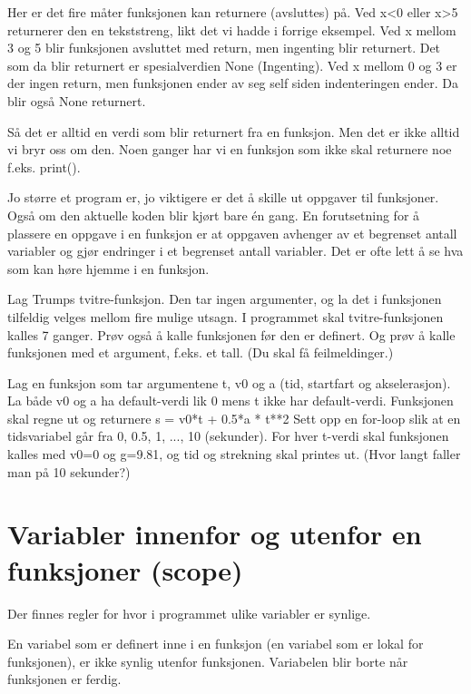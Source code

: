 Her er det fire måter funksjonen kan returnere (avsluttes) på. Ved x<0 eller x>5 returnerer den en tekststreng, likt det vi hadde i forrige eksempel. Ved x mellom 3 og 5 blir funksjonen avsluttet med return, men ingenting blir returnert. Det som da blir returnert er spesialverdien None (Ingenting). Ved x mellom 0 og 3 er der ingen return, men funksjonen ender av seg self siden indenteringen ender. Da blir også None returnert.

Så det er alltid en verdi som blir returnert fra en funksjon. Men det er ikke alltid vi bryr oss om den. Noen ganger har vi en funksjon som ikke skal returnere noe f.eks. print().

Jo større et program er, jo viktigere er det å skille ut oppgaver til funksjoner. Også om den aktuelle koden blir kjørt bare én gang. En forutsetning for å plassere en oppgave i en funksjon er at oppgaven avhenger av et begrenset antall variabler og gjør endringer i et begrenset antall variabler. Det er ofte lett å se hva som kan høre hjemme i en funksjon. 

\begin{exercise}
Lag Trumps tvitre-funksjon. Den tar ingen argumenter, og la det i funksjonen tilfeldig velges mellom fire mulige utsagn. I programmet skal tvitre-funksjonen kalles 7 ganger. Prøv også å kalle funksjonen før den er definert. Og prøv å kalle funksjonen med et argument, f.eks. et tall. (Du skal få feilmeldinger.) 
\end{exercise}

\begin{exercise}
Lag en funksjon som tar argumentene t, v0 og a (tid, startfart og akselerasjon). La både v0 og a ha default-verdi lik 0 mens t ikke har default-verdi. Funksjonen skal regne ut og returnere  s = v0*t + 0.5*a * t**2 Sett opp en for-loop slik at en tidsvariabel går fra 0, 0.5, 1, ..., 10 (sekunder). For hver t-verdi skal funksjonen kalles med v0=0 og g=9.81, og tid og strekning skal printes ut. (Hvor langt faller man på 10 sekunder?)
\end{exercise}

\section{Variabler innenfor og utenfor en funksjoner (scope)}

Der finnes regler for hvor i programmet ulike variabler er synlige. 

En variabel som er definert inne i en funksjon (en variabel som er lokal for funksjonen), er ikke synlig utenfor funksjonen. Variabelen blir borte når funksjonen er ferdig. 

